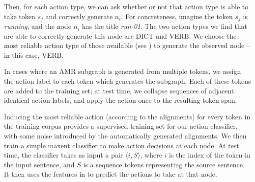 \documentclass[11pt]{article}
\newcommand\w[1]{\textit{#1}} %
\newcommand\n[1]{\textit{#1}} %
\begin{document}
Then, for each action type, we can ask whether or not that action type is able to 
  take token $s_j$ and correctly generate $n_i$. 
For concreteness, imagine the token $s_j$ is \w{running}, and the node $n_i$ has 
  the title \n{run-01}.
The two action types we find that are 
  able to correctly generate this node are DICT and VERB. 
We choose the most reliable action type of those available (see )
  to generate the observed node -- in this case, VERB.

In cases where an AMR subgraph is generated from multiple tokens, we assign the
  action label to each token which generates the subgraph.
Each of these tokens are added to the training set; at test time, we collapse
  sequences of adjacent identical action labels, and apply the action once to the
  resulting token span.
  
Inducing the most reliable action (according to the alignments) for every token in the training corpus provides a supervised training set for our action classifier, with some noise introduced by the automatically generated alignments.
We then train a simple maxent classifier to make action decisions at each node. 
At test time,
  the classifier takes as input a pair $\langle i, S \rangle$, where $i$ is the 
  index of the token in the input sentence, and $S$ is a sequence tokens 
  representing the source sentence.
It then uses the features in  to predict the actions to take at
  that node.



%
%
%
%
\end{document}
